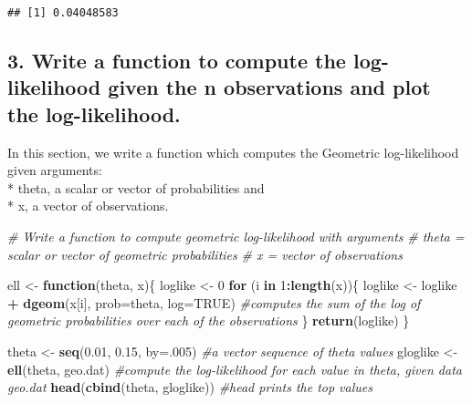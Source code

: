 \documentclass[
]{article}
\newenvironment{Shaded}{\begin{snugshade}}{\end{snugshade}}
\newcommand{\AttributeTok}[1]{\textcolor[rgb]{0.13,0.29,0.53}{#1}}
\newcommand{\CommentTok}[1]{\textcolor[rgb]{0.56,0.35,0.01}{\textit{#1}}}
\newcommand{\ConstantTok}[1]{\textcolor[rgb]{0.56,0.35,0.01}{#1}}
\newcommand{\ControlFlowTok}[1]{\textcolor[rgb]{0.13,0.29,0.53}{\textbf{#1}}}
\newcommand{\DecValTok}[1]{\textcolor[rgb]{0.00,0.00,0.81}{#1}}
\newcommand{\FloatTok}[1]{\textcolor[rgb]{0.00,0.00,0.81}{#1}}
\newcommand{\FunctionTok}[1]{\textcolor[rgb]{0.13,0.29,0.53}{\textbf{#1}}}
\newcommand{\NormalTok}[1]{#1}
\newcommand{\OtherTok}[1]{\textcolor[rgb]{0.56,0.35,0.01}{#1}}
\newcommand{\SpecialCharTok}[1]{\textcolor[rgb]{0.81,0.36,0.00}{\textbf{#1}}}
\begin{document}
\begin{verbatim}
## [1] 0.04048583
\end{verbatim}

\hypertarget{write-a-function-to-compute-the-log-likelihood-given-the-n-observations-and-plot-the-log-likelihood.}{%
\subsection{3. Write a function to compute the log-likelihood given the
n observations and plot the
log-likelihood.}\label{write-a-function-to-compute-the-log-likelihood-given-the-n-observations-and-plot-the-log-likelihood.}}

In this section, we write a function which computes the Geometric
log-likelihood given arguments:\\
* theta, a scalar or vector of probabilities and\\
* x, a vector of observations.

\begin{Shaded}
\begin{Highlighting}[]
\CommentTok{\# Write a function to compute geometric log{-}likelihood with arguments}
\CommentTok{\#  theta = scalar or vector of geometric probabilities}
\CommentTok{\#  x = vector of observations}

\NormalTok{ell }\OtherTok{\textless{}{-}}  \ControlFlowTok{function}\NormalTok{(theta, x)\{}
\NormalTok{  loglike }\OtherTok{\textless{}{-}} \DecValTok{0}
  \ControlFlowTok{for}\NormalTok{ (i }\ControlFlowTok{in} \DecValTok{1}\SpecialCharTok{:}\FunctionTok{length}\NormalTok{(x))\{}
\NormalTok{    loglike }\OtherTok{\textless{}{-}}\NormalTok{ loglike }\SpecialCharTok{+} \FunctionTok{dgeom}\NormalTok{(x[i], }\AttributeTok{prob=}\NormalTok{theta, }\AttributeTok{log=}\ConstantTok{TRUE}\NormalTok{)  }
      \CommentTok{\#computes the sum of the log of geometric probabilities over each of the observations}
\NormalTok{  \} }
  \FunctionTok{return}\NormalTok{(loglike)}
\NormalTok{\}}

\NormalTok{theta }\OtherTok{\textless{}{-}} \FunctionTok{seq}\NormalTok{(}\FloatTok{0.01}\NormalTok{, }\FloatTok{0.15}\NormalTok{, }\AttributeTok{by=}\NormalTok{.}\DecValTok{005}\NormalTok{)  }\CommentTok{\#a vector sequence of theta values}
\NormalTok{gloglike }\OtherTok{\textless{}{-}} \FunctionTok{ell}\NormalTok{(theta, geo.dat)    }\CommentTok{\#compute the log{-}likelihood for each value in theta, given data geo.dat}
\FunctionTok{head}\NormalTok{(}\FunctionTok{cbind}\NormalTok{(theta, gloglike))    }\CommentTok{\#head prints the top values}
\end{Highlighting}
\end{Shaded}
\end{document}
